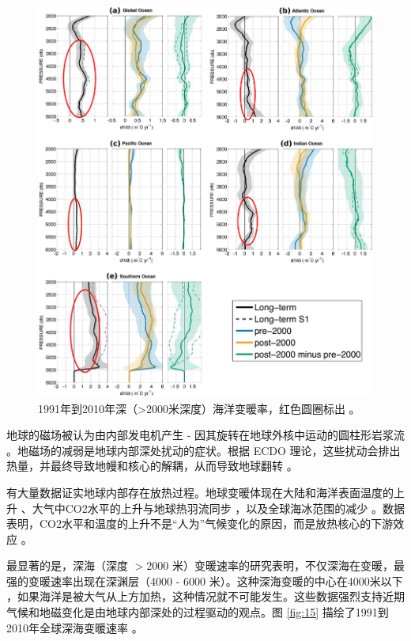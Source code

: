 \documentclass[10pt,twocolumn,letterpaper]{article}
\begin{document}
\begin{figure}[t]
\begin{center}
   \includegraphics[width=1\linewidth]{ocean-highlight.jpg}
\end{center}
   \caption{1991年到2010年深（>2000米深度）海洋变暖率，红色圆圈标出 \cite{132}。}
\label{fig:15}
\label{fig:onecol}
\end{figure}

地球的磁场被认为由内部发电机产生 - 因其旋转在地球外核中运动的圆柱形岩浆流 \cite{123}。地磁场的减弱是地球内部深处扰动的症状。根据 ECDO 理论，这些扰动会排出热量，并最终导致地幔和核心的解耦，从而导致地球翻转 \cite{1}。

有大量数据证实地球内部存在放热过程。地球变暖体现在大陆和海洋表面温度的上升 \cite{127,128}、大气中CO2水平的上升与地球热羽流同步 \cite{129,130}，以及全球海冰范围的减少 \cite{131}。数据表明，CO2水平和温度的上升不是“人为”气候变化的原因，而是放热核心的下游效应 \cite{129}。

最显著的是，深海（深度 $>$2000 米）变暖速率的研究表明，不仅深海在变暖，最强的变暖速率出现在深渊层（4000 - 6000 米）。这种深海变暖的中心在4000米以下 \cite{132,129}，如果海洋是被大气从上方加热，这种情况就不可能发生。这些数据强烈支持近期气候和地磁变化是由地球内部深处的过程驱动的观点。图 \ref{fig:15} 描绘了1991到2010年全球深海变暖速率 \cite{132}。
\end{document}
